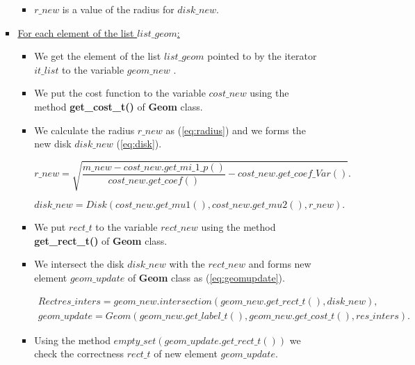 \documentclass{report}
\begin{document}
\begin{itemize}
\begin{itemize}
\begin{itemize}
\begin{itemize}
				\item $r\_new$ is a value of the radius for $disk\_new$.	
			\end{itemize}
	
			\item \underline {For each element of the list $list\_geom$:} 
			
			\begin{itemize}
				\item We get the element of the list $list\_geom$ pointed to by the iterator $it\_list$ to the variable $geom\_new$ .
				
				\item We put the cost function to the variable $cost\_new$ using the method {\bfseries get\_cost\_t()} of {\bfseries Geom} class.
				
				\item We calculate the radius $r\_new$ as (\ref{eq:radius}) and we forms the new disk $disk\_new$ (\ref{eq:disk}).
				
				\begin{equation}
					r\_new = \sqrt{\frac{m\_new - cost\_new.get\_mi\_1\_p()}{cost\_new.get\_coef()} - cost\_new.get\_coef\_Var()}.
					\label{eq:radius}
				\end{equation}
				
				\begin{equation}
					disk\_new = Disk(cost\_new.get\_mu1(), cost\_new.get\_mu2(), r\_new).
					\label{eq:disk}
				\end{equation}
				
				\item We put $rect\_t$ to the variable $rect\_new$ using the method {\bfseries get\_rect\_t()} of {\bfseries Geom} class.
				
				\item We intersect the disk $disk\_new$  with the $rect\_new$ and forms new element $geom\_update$ of {\bfseries Geom} class as (\ref{eq:geomupdate}).
			
				\begin{equation}
					\begin{gathered}
					Rect res\_inters = geom\_new.intersection(geom\_new.get\_rect\_t(), disk\_new),\\
					geom\_update = Geom(geom\_new.get\_label\_t(), geom\_new.get\_cost\_t(), res\_inters).
					\label{eq:geomupdate}
					\end{gathered}
				\end{equation}
				
				\item Using the method $empty\_set(geom\_update.get\_rect\_t())$ we check the correctness  $rect\_t$ of new element $geom\_update$. 
				

\end{itemize}
\end{itemize}
\end{itemize}
\end{itemize}
\end{document}
